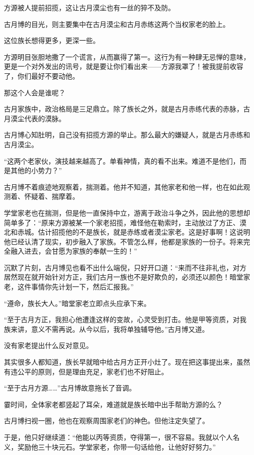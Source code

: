 \begin{this_body}
方源被人提前招揽，这让古月漠尘也有一丝的猝不及防。

古月博的目光，则主要集中在古月漠尘和古月赤练这两个当权家老的脸上。

这位族长想得更多，更深一些。

方源明目张胆地撒了一个谎言，从而赢得了第一。这行为有一种肆无忌惮的意味，更是一个对外发出的讯号，就是要让你们看出来——方源我罩了！被我提前收容了，你们最好不要动他。

那这个人会是谁呢？

古月家族中，政治格局是三足鼎立。除了族长之外，就是古月赤练代表的赤脉，古月漠尘代表的漠脉。

古月博心知肚明，自己没有招揽方源的举止。那么最大的嫌疑人，就是古月赤练和古月漠尘。

“这两个老家伙，演技越来越高了。单看神情，真的看不出来。难道不是他们，而是其他的小势力？”

古月博不着痕迹地观察着，揣测着。他并不知道，其他家老和他一样，也在如此观测着、怀疑着、揣摩着。

学堂家老也在揣测，但是他一直保持中立，游离于政治斗争之外，因此他的思想却简单多了：“原来方源被某一个家老招揽，难怪他在勒索时，主动放过了方正、漠北和赤城。估计招揽他的不是族长，就是赤练或者漠尘家老。这是好事啊！这说明他已经认清了现实，初步融入了家族。不管怎么样，他都是家族的一份子。将来完全融入进去，会甘愿为家族的奉献一生的！”

沉默了片刻，古月博见也看不出什么端倪，只好开口道：“来而不往非礼也，对方居然现在就开始针对方正，我们古月一族也不是好欺负的，必须还以颜色！暗堂家老，这件事情你先计划一下，然后汇报我。”

“遵命，族长大人。”暗堂家老立即点头应承下来。

“至于古月方正，我担心他遭逢这样的变故，心灵受到打击。他是甲等资质，对我族来讲，意义不需再说。从今以后，我将单独辅导他。”古月博又道。

没有家老提出什么反对意见。

其实很多人都知道，族长早就暗中给古月方正开小灶了。现在把这事提出来，虽然有违公平的原则，但是理由充足，家老们也不好阻止。

“至于古月方源……”古月博故意拖长了音调。

霎时间，全体家老都竖起了耳朵，难道就是族长暗中出手帮助方源的么？

古月博扫视一圈，他也在观察周围家老们的神色。但他注定失望了。

于是，他只好继续道：“他能以丙等资质，夺得第一，很不容易。我就以个人名义，奖励他三十块元石。学堂家老，你带一句话给他，让他好好努力。”


\end{this_body}
